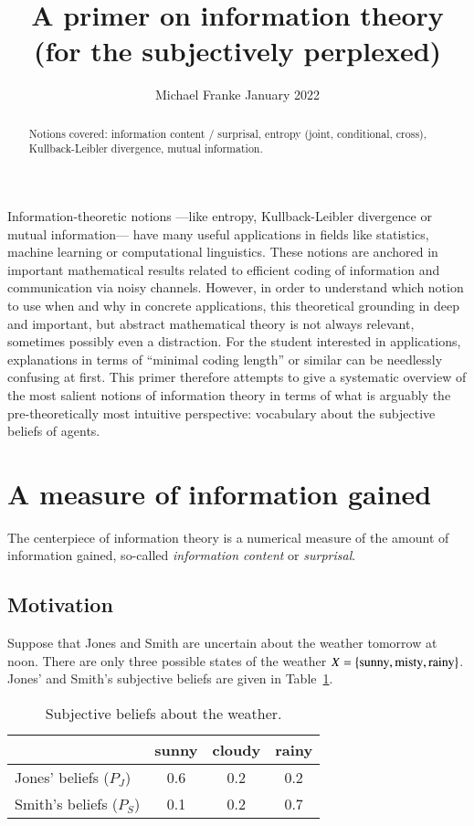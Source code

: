 \documentclass[nobib,nofonts]{tufte-handout}
\title{A primer on information theory \\ \normalsize{(for the subjectively perplexed)}}
\author[M.~Franke]{Michael Franke \hfill \normalsize{January 2022}}
\date{} %
\begin{document}
\maketitle

\begin{abstract}
\noindent
Notions covered: information content / surprisal, entropy (joint, conditional, cross), Kullback-Leibler divergence, mutual information.
\end{abstract}

\noindent
Information-theoretic notions ---like entropy, Kullback-Leibler divergence or mutual information--- have many useful applications in fields like statistics, machine learning or computational linguistics.
These notions are anchored in important mathematical results related to efficient coding of information and communication via noisy channels.
However, in order to understand which notion to use when and why in concrete applications, this theoretical grounding in deep and important, but abstract mathematical theory is not always relevant, sometimes possibly even a distraction.
For the student interested in applications, explanations in terms of ``minimal coding length'' or similar can be needlessly confusing at first.
This primer therefore attempts to give a systematic overview of the most salient notions of information theory in terms of what is arguably the pre-theoretically most intuitive perspective: vocabulary about the subjective beliefs of agents.

\section{A measure of information gained}

The centerpiece of information theory is a numerical measure of the amount of information gained, so-called \emph{information content} or \emph{surprisal}.

\subsection{Motivation}

Suppose that Jones and Smith are uncertain about the weather tomorrow at noon.
There are only three possible states of the weather $X = \left\{\text{sunny}, \text{misty}, \text{rainy}\right\}$.
Jones' and Smith's subjective beliefs are given in Table~\ref{tab:beliefs-weather}.

\begin{table}
  \centering
  \begin{tabular}{lccc}
    & sunny & cloudy & rainy \\ \midrule
    Jones' beliefs ($P_{J}$)  & 0.6   & 0.2    & 0.2   \\
    Smith's beliefs ($P_{S}$) & 0.1   & 0.2    & 0.7   \\
  \end{tabular}

  \caption{Subjective beliefs about the weather.}
  \label{tab:beliefs-weather}
\end{table}
\end{document}
